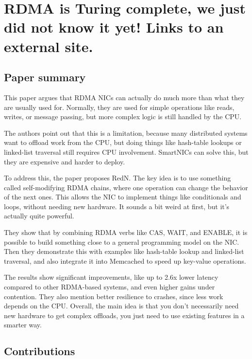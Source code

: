 \documentclass[a4paper, 12pt]{article}
\begin{document}
\section*{RDMA is Turing complete, we just did not know it yet! Links to an external site.}
\subsection{Paper summary}

This paper argues that RDMA NICs can actually do much more than what they are usually used for. Normally, they are used for simple operations like reads, writes, or message passing, but more complex logic is still handled by the CPU.

The authors point out that this is a limitation, because many distributed systems want to offload work from the CPU, but doing things like hash-table lookups or linked-list traversal still requires CPU involvement. SmartNICs can solve this, but they are expensive and harder to deploy.

To address this, the paper proposes RedN. The key idea is to use something called self-modifying RDMA chains, where one operation can change the behavior of the next ones. This allows the NIC to implement things like conditionals and loops, without needing new hardware. It sounds a bit weird at first, but it’s actually quite powerful.

They show that by combining RDMA verbs like CAS, WAIT, and ENABLE, it is possible to build something close to a general programming model on the NIC. Then they demonstrate this with examples like hash-table lookup and linked-list traversal, and also integrate it into Memcached to speed up key-value operations.

The results show significant improvements, like up to 2.6x lower latency compared to other RDMA-based systems, and even higher gains under contention. They also mention better resilience to crashes, since less work depends on the CPU. Overall, the main idea is that you don’t necessarily need new hardware to get complex offloads, you just need to use existing features in a smarter way.

\subsection{Contributions}
\end{document}
